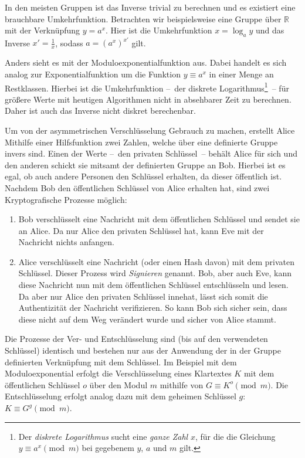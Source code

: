 In den meisten Gruppen ist das Inverse trivial zu berechnen und es existiert eine brauchbare Umkehrfunktion.
Betrachten wir beispielsweise eine Gruppe über $\mathbb{R}$ mit der Verknüpfung $y=a^x$.
Hier ist die Umkehrfunktion $x=\log_a y$ und das Inverse $x'=\frac{1}{x}$, sodass $a=(a^x)^{x'}$ gilt.

Anders sieht es mit der Moduloexponentialfunktion aus.
Dabei handelt es sich analog zur Exponentialfunktion um die Funktion $y \equiv a^x$ in einer Menge an Restklassen.
Hierbei ist die Umkehrfunktion --~der diskrete Logarithmus\footnote{Der \emph{diskrete Logarithmus} sucht eine \emph{ganze Zahl} $x$, für die die Gleichung $y \equiv a^x \pmod{m}$ bei gegebenem $y$, $a$ und $m$ gilt.}~-- für größere Werte mit heutigen Algorithmen nicht in absehbarer Zeit zu berechnen.
Daher ist auch das Inverse nicht diskret berechenbar.

Um von der asymmetrischen Verschlüsselung Gebrauch zu machen, erstellt Alice Mithilfe einer Hilfsfunktion zwei Zahlen, welche über eine definierte Gruppe invers sind.
Einen der Werte --~den privaten Schlüssel~-- behält Alice für sich und den anderen schickt sie mitsamt der definierten Gruppe an Bob.
Hierbei ist es egal, ob auch andere Personen den Schlüssel erhalten, da dieser öffentlich ist.
Nachdem Bob den öffentlichen Schlüssel von Alice erhalten hat, sind zwei Kryptografische Prozesse möglich:
\begin{enumerate}
    \item Bob verschlüsselt eine Nachricht mit dem öffentlichen Schlüssel und sendet sie an Alice.
    Da nur Alice den privaten Schlüssel hat, kann Eve mit der Nachricht nichts anfangen.
    \item Alice verschlüsselt eine Nachricht (oder einen Hash davon) mit dem privaten Schlüssel.
    Dieser Prozess wird \emph{Signieren} genannt.
    Bob, aber auch Eve, kann diese Nachricht nun mit dem öffentlichen Schlüssel entschlüsseln und lesen.
    Da aber nur Alice den privaten Schlüssel innehat, lässt sich somit die Authentizität der Nachricht verifizieren.
    So kann Bob sich sicher sein, dass diese nicht auf dem Weg verändert wurde und sicher von Alice stammt.
\end{enumerate}

Die Prozesse der Ver- und Entschlüsselung sind (bis auf den verwendeten Schlüssel) identisch und bestehen nur aus der Anwendung der in der Gruppe definierten Verknüpfung mit dem Schlüssel.
Im Beispiel mit dem Moduloexponential erfolgt die Verschlüsselung eines Klartextes $K$ mit dem öffentlichen Schlüssel $o$ über den Modul $m$ mithilfe von $G \equiv K^o \pmod{m}$.
Die Entschlüsselung erfolgt analog dazu mit dem geheimen Schlüssel $g$: $K \equiv G^g \pmod{m}$.

